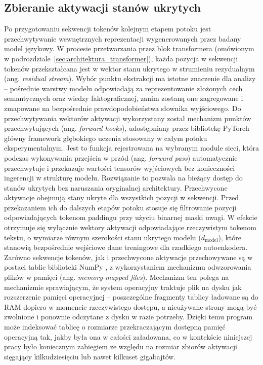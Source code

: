   \subsection{Zbieranie aktywacji stanów ukrytych}
  \label{sec:zbieranie_aktywacji}
  Po przygotowaniu sekwencji tokenów kolejnym etapem potoku jest przechwytywanie wewnętrznych reprezentacji wygenerowanych przez badany model językowy. W procesie przetwarzania przez blok transformera (omówionym w podrozdziale~\ref{sec:architektura_transformer}), każda pozycja w sekwencji tokenów przekształcana jest w wektor stanu ukrytego w strumieniu rezydualnym (ang. \textit{residual stream}). Wybór punktu ekstrakcji ma istotne znaczenie dla analizy -- pośrednie warstwy modelu odpowiadają za reprezentowanie złożonych cech semantycznych oraz wiedzy faktograficznej, zanim zostaną one zagregowane i zmapowane na bezpośrednie prawdopodobieństwa słownika wyjściowego. \newline
  Do przechwytywania wektorów aktywacji wykorzystany został mechanizm punktów przechwytujących (ang. \textit{forward hooks}), udostępniany przez bibliotekę PyTorch \cite{paszke_2019_pytorch_imperative_style_high_performance} -- główny framework głębokiego uczenia stosowany w całym potoku eksperymentalnym. Jest to funkcja rejestrowana na wybranym module sieci, która podczas wykonywania przejścia w przód (ang. \textit{forward pass}) automatycznie przechwytuje i przekazuje wartości tensorów wyjściowych bez konieczności ingerencji w strukturę modelu. Rozwiązanie to pozwala na bieżący dostęp do stanów ukrytych bez naruszania oryginalnej architektury. \newline
  Przechwycone aktywacje obejmują stany ukryte dla wszystkich pozycji w sekwencji. Przed przekazaniem ich do dalszych etapów potoku stosuje się filtrowanie pozycji odpowiadających tokenom paddingu przy użyciu binarnej maski uwagi. W efekcie otrzymuje się wyłącznie wektory aktywacji odpowiadające rzeczywistym tokenom tekstu, o wymiarze równym szerokości stanu ukrytego modelu ($d_{\mathrm{model}}$), które stanowią bezpośrednie wejściowe dane treningowe dla rzadkiego autoenkodera. \newline
  Zarówno sekwencje tokenów, jak i przechwycone aktywacje przechowywane są w postaci tablic biblioteki NumPy \cite{harris_2020_array_programming_with_numpy}, z wykorzystaniem mechanizmu odwzorowania plików w pamięci (ang. \textit{memory-mapped files}). Mechanizm ten polega na mechanizmie sprawiającym, że system operacyjny traktuje plik na dysku jak rozszerzenie pamięci operacyjnej -- poszczególne fragmenty tablicy ładowane są do RAM dopiero w momencie rzeczywistego dostępu, a nieużywane strony mogą być zwolnione i ponownie odczytane z dysku w razie potrzeby. Dzięki temu program może indeksować tablicę o rozmiarze przekraczającym dostępną pamięć operacyjną tak, jakby była ona w całości załadowana, co w kontekście niniejszej pracy było koniecznym zabiegiem ze względu na rozmiar zbiorów aktywacji sięgający kilkudziesięciu lub nawet kilkuset gigabajtów.
  
